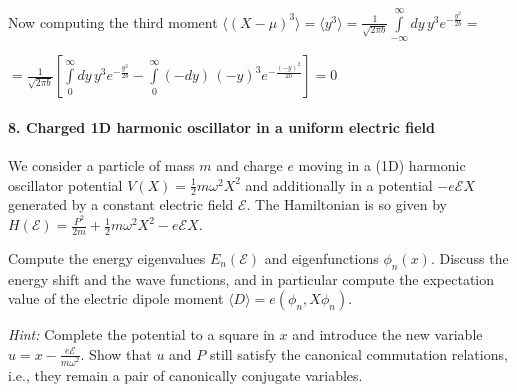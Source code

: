 \documentclass[11pt,a4paper]{scrartcl}
\begin{document}
\begin{enumerate}[label=(\alph*)]
\begin{calculationbox}
        Now computing the third moment $\langle (X - \mu)^3\rangle = \langle y^3 \rangle = \frac{1}{\sqrt{2\pi b}} \int\limits_{-\infty}^\infty dy\,y^3 e^{-\frac{y^2}{2b}} =$ 
        
        $= \frac{1}{\sqrt{2\pi b}} \left[\int\limits_{0}^\infty dy\,y^3 e^{-\frac{y^2}{2b}} - \int\limits_{0}^\infty (-dy)\,(-y)^3 e^{-\frac{(-y)^2}{2b}}\right] = 0$
    \end{calculationbox}

\end{enumerate}

\paragraph{8. Charged 1D harmonic oscillator in a uniform electric field} We consider a particle of mass $m$ and charge $e$ moving in a (1D) harmonic oscillator potential $V(X) = \frac{1}{2} m \omega^2 X^2$ and additionally in a potential $-e\mathcal{E}X$ generated by a constant electric field $\mathcal{E}$. The Hamiltonian is so given by
$
    H(\mathcal{E}) = \frac{P^2}{2m} + \frac{1}{2} m \omega^2 X^2 - e\mathcal{E}X.
$

Compute the energy eigenvalues $E_n(\mathcal{E})$ and eigenfunctions $\phi_n(x)$. Discuss the energy shift and the wave functions, and in particular compute the expectation value of the electric dipole moment $\langle D \rangle = e(\phi_n, X \phi_n)$.  

\textit{Hint:} Complete the potential to a square in $x$ and introduce the new variable $u = x - \frac{e\mathcal{E}}{m\omega^2}$. Show that $u$ and $P$ still satisfy the canonical commutation relations, i.e., they remain a pair 
of canonically conjugate variables.
\end{document}
